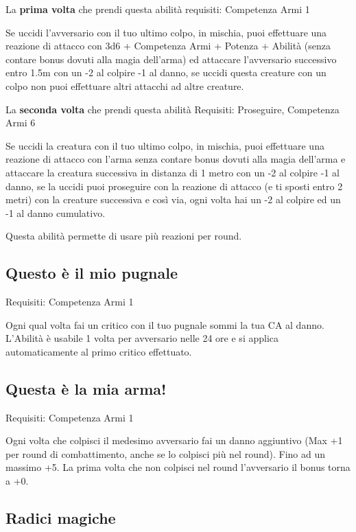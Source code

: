 \documentclass[a4paper,11pt,twoside,openany]{book}
\begin{document}
La \textbf{prima volta} che prendi questa abilità requisiti: Competenza Armi 1

Se uccidi l'avversario con il tuo ultimo colpo, in mischia, puoi effettuare una reazione di attacco con 3d6 + Competenza Armi + Potenza + Abilità (senza contare bonus dovuti alla magia dell'arma) ed attaccare l'avversario successivo entro 1.5m con un -2 al colpire -1 al danno, se uccidi questa creature con un colpo non puoi effettuare altri attacchi ad altre creature.

La \textbf{seconda volta} che prendi questa abilità Requisiti: Proseguire, Competenza Armi 6

Se uccidi la creatura con il tuo ultimo colpo, in mischia, puoi effettuare una reazione di attacco con l'arma senza contare bonus dovuti alla magia dell'arma e attaccare la creatura successiva in distanza di 1 metro con un -2 al colpire -1 al danno, se la uccidi puoi proseguire con la reazione di attacco (e ti sposti entro 2 metri) con la creature successiva e così via, ogni volta hai un -2 al colpire ed un -1 al danno cumulativo.

Questa abilità permette di usare più reazioni per round.

\subsection{Questo è il mio pugnale}

Requisiti: Competenza Armi 1

Ogni qual volta fai un critico con il tuo pugnale sommi la tua CA al danno. L'Abilità è usabile 1 volta per avversario nelle 24 ore e si applica automaticamente al primo critico effettuato.

\subsection{Questa è la mia arma!}

Requisiti: Competenza Armi 1

Ogni volta che colpisci il medesimo avversario fai un danno aggiuntivo (Max +1 per round di combattimento, anche se lo colpisci più nel round). Fino ad un massimo +5. La prima volta che non colpisci nel round l'avversario il bonus torna a +0.

\subsection{Radici magiche}
\end{document}
